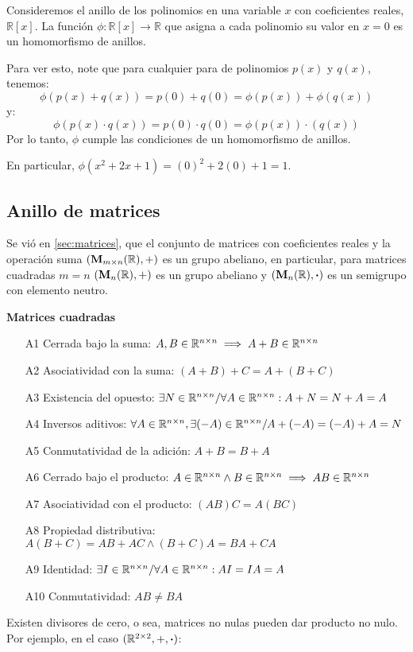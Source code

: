 \begin{fmd-example}
Consideremos el anillo de los polinomios en una variable $x$ con coeficientes reales, $\mathbb{R}[x]$. La función $\phi: \mathbb{R}[x] \to \mathbb{R}$ que asigna a cada polinomio su valor en $x = 0$ es un homomorfismo de anillos.

Para ver esto, note que para cualquier para de polinomios $p(x)$ y $q(x)$, tenemos:
\[
\phi \left(p(x) + q(x)\right) = p(0) + q(0) = \phi(p(x)) + \phi(q(x))
\]
y:
\[
\phi \left(p(x) \cdot q(x)\right) = p(0) \cdot q(0) = \phi \left(p(x)\right) \cdot \left(q(x)\right)
\]
Por lo tanto, $\phi$ cumple las condiciones de un homomorfismo de anillos.

En particular, $\phi(x^2 + 2x + 1) = (0)^2 + 2(0) + 1 = 1$.
\end{fmd-example}

\subsection{Anillo de matrices} \label{sec:matrices2}
Se vió en \ref{sec:matrices}, que el conjunto de matrices con coeficientes reales y la operación suma $(\mathbf{M}_{m \times n}(\mathbb{R}), +)$ es un grupo abeliano, en particular, para matrices cuadradas $m=n$ $(\mathbf{M}_{n}(\mathbb{R}), +)$ es un grupo abeliano y $(\mathbf{M}_{n}(\mathbb{R}), \boldsymbol{\cdot})$ es un semigrupo con elemento neutro.

\textbf{Matrices cuadradas}
\begin{itemize}
	\item[A1] Cerrada bajo la suma: $A, B \in \mathbb{R}^{n \times n} \implies A + B \in \mathbb{R}^{n\times n}$  \cmark
	\item[A2] Asociatividad con la suma: $(A + B) + C = A + (B + C)$ \cmark
	\item[A3] Existencia del opuesto: $ \exists N \in \mathbb{R}^{n \times n} / \forall A \in \mathbb{R}^{n \times n}: A + N = N + A = A $  \cmark
	\item[A4] Inversos aditivos: $ \forall A \in \mathbb{R}^{n \times n}, \exists (-A) \in \mathbb{R}^{n \times n} / A + (-A) = (-A)  + A = N$ \cmark
	\item[A5] Conmutatividad de la adición: $A + B = B + A$ \cmark
	\item[A6] Cerrado bajo el producto: $A \in \mathbb{R}^{n \times n} \land B \in \mathbb{R}^{n \times n} \implies AB \in \mathbb{R}^{n \times n}$  \cmark
	\item[A7] Asociatividad con el producto: $(AB)C = A(BC)$ \cmark
	\item[A8] Propiedad distributiva: $A(B+C) = AB + AC \land (B + C)A = BA + CA$ \cmark 
	\item[A9] Identidad: $\exists I \in \mathbb{R}^{n \times n} / \forall A \in \mathbb{R}^{n \times n}: A I = I A = A $ \cmark
	\item[A10] Conmutatividad: $AB \ne BA$  \xmark
\end{itemize}
Existen divisores de cero, o sea, matrices no nulas pueden dar producto no nulo. Por ejemplo, en el caso $(\mathbb{R}^{2 \times 2}, +, \boldsymbol{\cdot})$:

